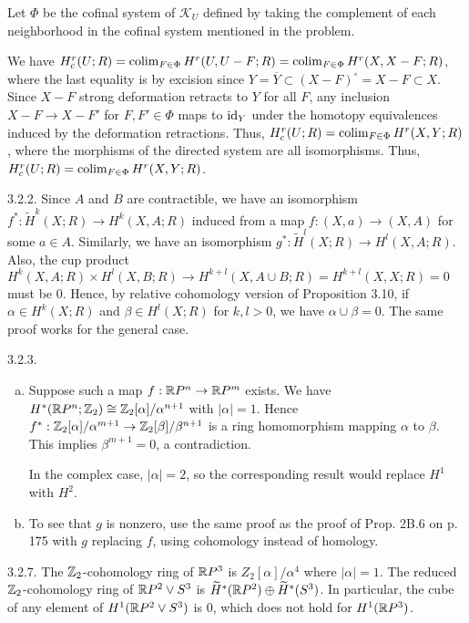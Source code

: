 \documentclass{article}
\begin{document}
 Let $\Phi$ be the cofinal system of $\mathcal{K}_U$ defined by taking the complement of each neighborhood in the cofinal system mentioned in the problem. 
 
We have $H^r_c(U; R) = \operatorname{colim}_{F \in \Phi} H^r(U, U - F; R) = \operatorname{colim}_{F \in \Phi} H^r(X, X - F; R)$, where the last equality is by excision since $Y = \overline Y \subset (X - F)^\circ = X - F \subset X$. Since $X - F$ strong deformation retracts to $Y$ for all $F$, any inclusion $X - F \to X - F'$ for $F, F' \in \Phi$  maps to $\operatorname{id}_Y$ under the homotopy equivalences induced by the deformation retractions. Thus, $H^r_c(U; R) = \operatorname{colim}_{F \in \Phi} H^r(X, Y; R)$, where the morphisms of the directed system are all isomorphisms.  Thus, $H^r_c(U; R) = \operatorname{colim}_{F \in \Phi} H^r(X, Y; R)$.

 3.2.2. Since $A$ and $B$ are contractible, we have an isomorphism $f^*: \widetilde H^k(X;R) \to H^k(X, A;R)$ induced from a map $f:(X,a) \to (X,A)$ for some $a \in A$. Similarly, we have an isomorphism $g^*: \widetilde H^l(X;R) \to H^l(X,A;R)$. Also, the cup product 
$H^k(X,A;R) \times H^l(X,B;R) \to H^{k+l}(X, A \cup B; R) = H^{k+l}(X, X; R) = 0$ must be 0.  Hence, by relative cohomology version of Proposition 3.10, if $\alpha \in H^k(X;R)$ and $\beta \in H^l(X;R)$ for $k, l > 0$, we have $\alpha \cup \beta = 0$. The same proof works for the general case.

 3.2.3. 
\begin{enumerate}[(a)]
\item Suppose such a map $f: \mathbb{R} P^n \to \mathbb{R} P^m$ exists. We have $H^*(\mathbb{R} P^n;\mathbb{Z}_2) \cong \mathbb{Z}_2[\alpha]/\alpha^{n+1}$ with $|\alpha| = 1$. Hence $f^*:\mathbb{Z}_2[\alpha]/\alpha^{m+1} \to \mathbb{Z}_2[\beta]/\beta^{n+1}$ is a ring homomorphism mapping $\alpha$ to $\beta$. This implies $\beta^{m+1} = 0$, a contradiction.

In the complex case, $|\alpha| = 2$, so the corresponding result would replace $H^1$ with $H^2$.

\item To see that $g$ is nonzero, use the same proof as the proof of Prop. 2B.6 on p. 175 with $g$ replacing $f$, using cohomology instead of homology.
\end{enumerate}

 3.2.7. The $\mathbb{Z}_2$-cohomology ring of $\mathbb{R} P^3$ is $Z_2[\alpha]/\alpha^4$ where $|\alpha| = 1$. The reduced $\mathbb{Z}_2$-cohomology ring of $\mathbb{R} P^2 \vee S^3$ is
$\widetilde H^*(\mathbb{R} P^2) \oplus \widetilde H^*(S^3)$. In particular, the cube of any element of $H^1(\mathbb{R} P^2 \vee S^3)$ is $0$, which does not hold for $H^1(\mathbb{R} P^3)$.
\end{document}
